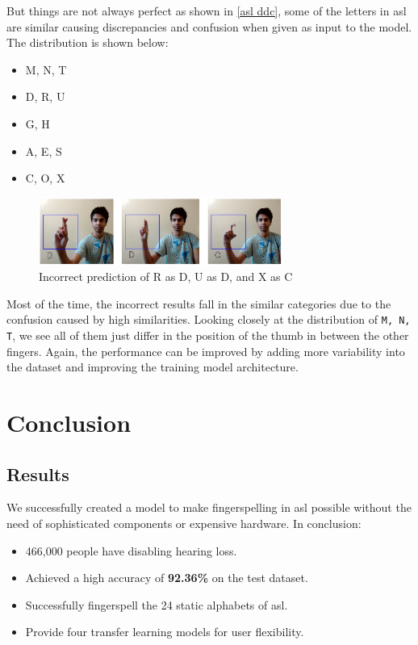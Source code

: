 \documentclass[twocolumn]{article}
\begin{document}
But things are not always perfect as shown in \autoref{asl ddc}, some of the 
letters in \gls{asl} are similar causing discrepancies and confusion when 
given as input to the model. The distribution is shown below:
\begin{itemize}
  \item M, N, T
  \item D, R, U
  \item G, H
  \item A, E, S
  \item C, O, X
\end{itemize}

\begin{figure}[h]
\centering
\includegraphics[width=8cm]{./figures/asl ddc}
\caption{Incorrect prediction of R as D, U as D, and X as C}
\label{asl ddc}
\end{figure}

Most of the time, the incorrect results fall in the similar categories due to the confusion caused by high similarities. Looking closely at the distribution of \texttt{{M, N, T}}, we see all of them just differ in the position of the thumb in between the other fingers. Again, the performance can be improved by adding more variability into the dataset and improving the training model architecture.


\section{Conclusion}

\subsection{Results}

We successfully created a model to make fingerspelling in \gls{asl} possible 
without the need of sophisticated components or expensive hardware. In 
conclusion:

\begin{itemize}
  \item 466,000 people have disabling hearing loss.
  \item Achieved a high accuracy of \textbf{92.36\%} on the test dataset.
  \item Successfully fingerspell the 24 static alphabets of \gls{asl}.
  \item Provide four transfer learning models for user flexibility.
\end{itemize}
\end{document}
